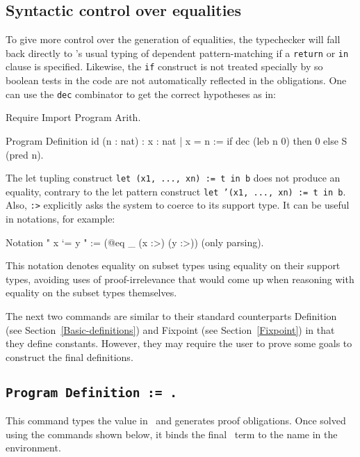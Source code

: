 \subsection{Syntactic control over equalities}
\label{ProgramSyntax}
To give more control over the generation of equalities, the typechecker will
fall back directly to \Coq's usual typing of dependent pattern-matching
if a {\tt return} or {\tt in} clause is specified. Likewise,
the {\tt if} construct is not treated specially by \Program{} so boolean
tests in the code are not automatically reflected in the obligations. 
One can use the {\tt dec} combinator to get the correct hypotheses as in:

\begin{coq_eval}
Require Import Program Arith.
\end{coq_eval}
\begin{coq_example}
Program Definition id (n : nat) : { x : nat | x = n } :=
  if dec (leb n 0) then 0
  else S (pred n).
\end{coq_example}

The let tupling construct {\tt let (x1, ..., xn) := t in b}
does not produce an equality, contrary to the let pattern construct 
{\tt let '(x1, ..., xn) := t in b}.
Also, {\tt {\term}:>} explicitly asks the system to coerce {\tt \term} to its
support type. It can be useful in notations, for example:
\begin{coq_example}
Notation " x `= y " := (@eq _ (x :>) (y :>)) (only parsing).
\end{coq_example}

This notation denotes equality on subset types using equality on their
support types, avoiding uses of proof-irrelevance that would come up
when reasoning with equality on the subset types themselves. 

The next two commands are similar to their standard counterparts
Definition (see Section~\ref{Basic-definitions}) and Fixpoint (see Section~\ref{Fixpoint}) in that
they define constants. However, they may require the user to prove some
goals to construct the final definitions.

\subsection{\tt Program Definition {\ident} := {\term}.
  \label{ProgramDefinition}}

This command types the value {\term} in \Russell\ and generates proof
obligations. Once solved using the commands shown below, it binds the final
\Coq\ term to the name {\ident} in the environment.

